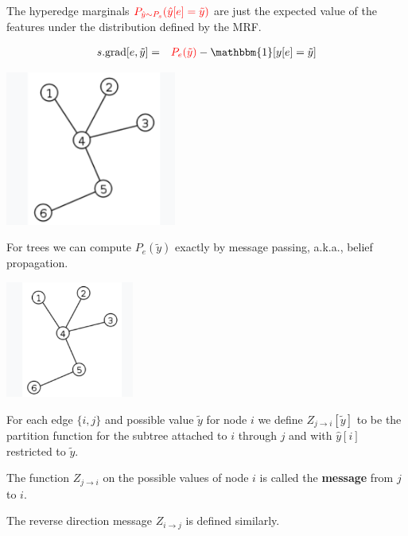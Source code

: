 {{

The hyperedge marginals  ${\color{red} P_{\hat{y} \sim P_s}(\hat{y}[e] = \tilde{y})}$ are just the expected value of the features under the distribution
defined by the MRF.
}


\begin{eqnarray*}
  s.\mathrm{grad}[e,\tilde{y}] & = & {\color{red} P_e(\tilde{y})} - \mathbbm{1}[y[e] = \tilde{y}]
\end{eqnarray*}

\vfill
\centerline{\includegraphics[height= 2in]{../images/Tree}}

\vfill
For trees we can compute $P_{e}(\tilde{y})$ exactly by message passing, a.k.a., belief propagation.


\centerline{\includegraphics[height=1.5in]{../images/Tree}}

\vfill
For each edge $\{i,j\}$ and possible value $\tilde{y}$ for node $i$ we define {\color{red} $Z_{j \rightarrow i}[\tilde{y}]$}
to be  the partition function for the subtree attached to $i$ through $j$ and
with $\hat{y}[i]$ restricted to $\tilde{y}$.

\vfill
The function $Z_{j \rightarrow i}$ on the possible values of node $i$ is called the {\bf message} from $j$ to $i$.

\vfill
The reverse direction message $Z_{i \rightarrow j}$ is defined similarly.

}
